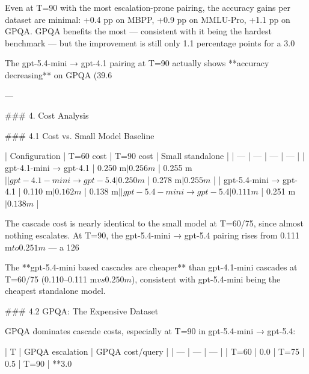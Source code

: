 Even at T=90 with the most escalation-prone pairing, the accuracy gains per dataset are minimal: +0.4 pp on MBPP, +0.9 pp on MMLU-Pro, +1.1 pp on GPQA. GPQA benefits the most — consistent with it being the hardest benchmark — but the improvement is still only 1.1 percentage points for a 3.0%

The gpt-5.4-mini → gpt-4.1 pairing at T=90 actually shows **accuracy decreasing** on GPQA (39.6%

---

### 4. Cost Analysis

### 4.1 Cost vs. Small Model Baseline

| Configuration | T=60 cost | T=90 cost | Small standalone |
| --- | --- | --- | --- |
| gpt-4.1-mini → gpt-4.1 | 0.250 m$ | 0.256 m$ | 0.255 m$ |
| gpt-4.1-mini → gpt-5.4 | 0.250 m$ | 0.278 m$ | 0.255 m$ |
| gpt-5.4-mini → gpt-4.1 | 0.110 m$ | 0.162 m$ | 0.138 m$ |
| gpt-5.4-mini → gpt-5.4 | 0.111 m$ | 0.251 m$ | 0.138 m$ |

The cascade cost is nearly identical to the small model at T=60/75, since almost nothing escalates. At T=90, the gpt-5.4-mini → gpt-5.4 pairing rises from 0.111 m$ to 0.251 m$ — a 126%

The **gpt-5.4-mini based cascades are cheaper** than gpt-4.1-mini cascades at T=60/75 (0.110–0.111 m$ vs 0.250 m$), consistent with gpt-5.4-mini being the cheapest standalone model.

### 4.2 GPQA: The Expensive Dataset

GPQA dominates cascade costs, especially at T=90 in gpt-5.4-mini → gpt-5.4:

| T | GPQA escalation | GPQA cost/query |
| --- | --- | --- |
| T=60 | 0.0%
| T=75 | 0.5%
| T=90 | **3.0%

